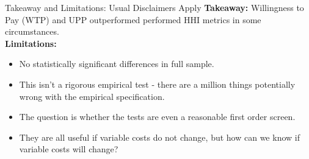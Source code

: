 \documentclass{beamer}
\begin{document}
\begin{frame}{Takeaway and Limitations: Usual Disclaimers Apply}
\textbf{Takeaway:}  Willingness to Pay (WTP) and UPP outperformed performed HHI metrics in some circumstances. \\

\textbf{Limitations:}
    \begin{itemize}
        \item No statistically significant differences in full sample.
        \item This isn't a rigorous empirical test - there are a million things potentially wrong with the empirical specification.
        \item The question is whether the tests are even a reasonable first order screen.
        \item They are all useful if variable costs do not change, but how can we know if variable costs will change?
        
    \end{itemize}
\end{frame}
\end{document}
